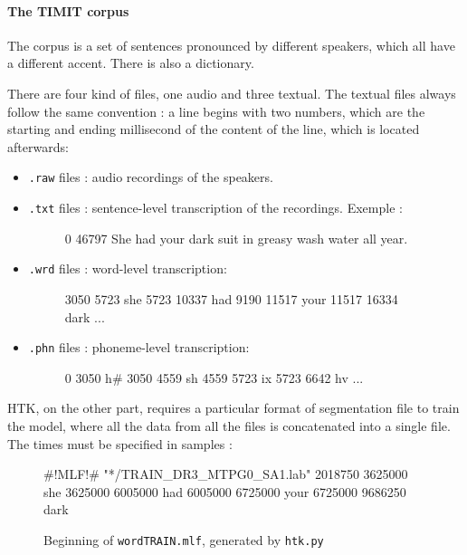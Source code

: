 \paragraph{The TIMIT corpus}
The corpus is a set of sentences pronounced by different speakers, which all have a different accent. There is also a dictionary.

There are four kind of files, one audio and three textual.
The textual files always follow the same convention : a line begins with two numbers, which are the starting and ending millisecond of the content of the line, which is located afterwards:
\begin{itemize}
\item \texttt{.raw} files : audio recordings of the speakers.
\item \texttt{.txt} files : sentence-level transcription of the recordings. Exemple :
\begin{figure}[h]
\centering
\begin{verbbox} 0 46797 She had your dark suit in greasy wash water all year. \end{verbbox}
\theverbbox
\end{figure}
\item \texttt{.wrd} files : word-level transcription:
\begin{figure}[h]
\centering
\begin{verbbox}3050 5723 she
5723 10337 had
9190 11517 your
11517 16334 dark 
...
\end{verbbox}
\theverbbox
\end{figure}
\item \texttt{.phn} files : phoneme-level transcription:
\begin{figure}[h]
\centering
\begin{verbbox}0 3050 h#
3050 4559 sh
4559 5723 ix
5723 6642 hv 
...
\end{verbbox}
\theverbbox
\end{figure}
\end{itemize}

\ac{HTK}, on the other part, requires a particular format of segmentation file to train the model, where all the data from all the files is concatenated into a single file. The times must be specified in samples : 
\begin{figure}[h]
\centering
\begin{verbbox}
#!MLF!#
"*/TRAIN_DR3_MTPG0_SA1.lab"
2018750 3625000 she
3625000 6005000 had 
6005000 6725000 your 
6725000 9686250 dark 
\end{verbbox}
\theverbbox
\caption{Beginning of \texttt{wordTRAIN.mlf}, generated by \texttt{htk.py}}
\end{figure}

